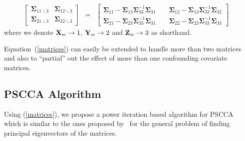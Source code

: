 \documentclass{llncs}
\newcommand{\X}{{\bf X}}
\newcommand{\Y}{{\bf Y}}
\newcommand{\Z}{{\bf Z}}
\newcommand{\bs}{\boldsymbol}
\begin{document}
\begin{eqnarray}
\label{matrices}
\begin{bmatrix}
  \bs\Sigma_{11\backslash 3} & \bs\Sigma_{12\backslash 3} \\
  \bs\Sigma_{21\backslash 3} & \bs\Sigma_{22\backslash 3} 
\end{bmatrix}
&=&
\begin{bmatrix}
  \bs\Sigma_{11} -\bs\Sigma_{13}\bs\Sigma_{33}^{-1}\bs \Sigma_{31} &\;\;\;\; \bs\Sigma_{12} -\bs\Sigma_{13}\bs\Sigma_{33}^{-1}\bs \Sigma_{32}\\
  \bs\Sigma_{21} -\bs\Sigma_{23}\bs\Sigma_{33}^{-1}\bs \Sigma_{31} &\;\;\;\; \bs\Sigma_{22} -\bs\Sigma_{23}\bs\Sigma_{33}^{-1}\bs \Sigma_{33}
\end{bmatrix}
\end{eqnarray}
where we denote $\X_w \rightarrow 1$, $\Y_w \rightarrow 2$ and $\Z_w \rightarrow 3$ as shorthand.

Equation~(\ref{matrices}) can easily be extended to handle more than two matrices and also to ``partial'' out the effect of more than one confounding covariate matrices.




\subsection{PSCCA Algorithm}
Using (\ref{matrices}), we propose a power iteration based algorithm for PSCCA which is similar to the ones proposed by~\cite{golub} for the general problem of finding principal eigenvectors of the matrices.
\end{document}
